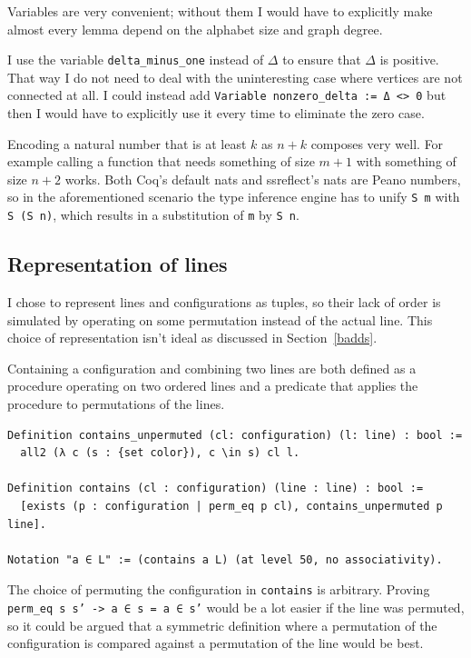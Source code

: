 \documentclass[english, 12pt, a4paper, sci, a-1b, online]{aaltothesis}
\newcommand\icoq[1]{\texttt{#1}}
\begin{document}
Variables are very convenient; without them I would have to explicitly make almost every lemma depend on the alphabet size and graph degree.

I use the variable \icoq{delta_minus_one} instead of $\Delta$ to ensure that $\Delta$ is positive. That way I do not need to deal with the uninteresting case where vertices are not connected at all. I could instead add \icoq{Variable nonzero_delta := Δ <> 0} but then I would have to explicitly use it every time to eliminate the zero case.

Encoding a natural number that is at least $k$ as $n + k$ composes very well. For example calling a function that needs something of size $m + 1$ with something of size $n + 2$ works. Both Coq's default nats and ssreflect's nats are Peano numbers, so in the aforementioned scenario the type inference engine has to unify \icoq{S m} with \icoq{S (S n)}, which results in a substitution of \icoq{m} by \icoq{S n}.

\subsection{Representation of lines}

I chose to represent lines and configurations as tuples, so their lack of order is simulated by operating on some permutation instead of the actual line. This choice of representation isn't ideal as discussed in Section~\ref{badds}.

Containing a configuration and combining two lines are both defined as a procedure operating on two ordered lines and a predicate that applies the procedure to permutations of the lines.

\begin{verbatim}
Definition contains_unpermuted (cl: configuration) (l: line) : bool :=
  all2 (λ c (s : {set color}), c \in s) cl l.

Definition contains (cl : configuration) (line : line) : bool :=
  [exists (p : configuration | perm_eq p cl), contains_unpermuted p line].

Notation "a ∈ L" := (contains a L) (at level 50, no associativity).
\end{verbatim}

The choice of permuting the configuration in \icoq{contains} is arbitrary. Proving \icoq{perm_eq s s' -> a ∈ s = a ∈ s'} would be a lot easier if the line was permuted, so it could be argued that a symmetric definition where a permutation of the configuration is compared against a permutation of the line would be best.
\end{document}
